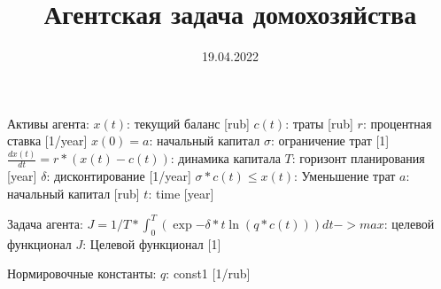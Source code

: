 \documentclass{a_model}
\title{Агентская задача домохозяйства}
\date{19.04.2022}
\begin{document}
Активы агента:
    $x(t)$: текущий баланс [rub]
    $c(t)$: траты [rub]
    $r$: процентная ставка [1/year]
    $x(0) = a$: начальный капитал
    $\sigma$: ограничение трат [1]
    $\frac{dx(t)}{dt} = r*(x(t)-c(t))$: динамика капитала
    $T$: горизонт планирования [year]
    $\delta$: дисконтирование [1/year]
    $\sigma*c(t)\leq x(t)$: Уменьшение трат
    $a$: начальный капитал [rub]
    $t$: time [year]

Задача агента:
    $J = 1/T * \int_0^T (\exp{-\delta*t} \ln(q*c(t)))dt -> max$: целевой функционал
    $J$: Целевой функционал [1]

Нормировочные константы:
    $q$: const1 [1/rub]
\end{document}
